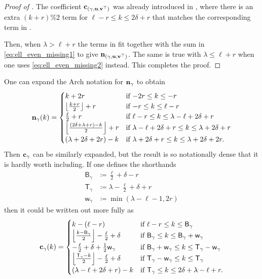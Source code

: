\elleven*
\begin{proof}
  [Proof of ]
  The coefficient $\mathbf c_{(\gamma, \mathbf u, \mathbf v^\top)}$ was already introduced in ,
  where there is an extra $(k+r)\%2$ term for $\ell-r \le k \le 2\delta+r$
  that matches the corresponding term in .

  Then, when $\lambda > \ell + r$ the terms in 
  fit together with the sum in \eqref{eq:ell_even_missing1} to give $\mathbf n_{(\gamma, \mathbf u, \mathbf v^\top)}$.
  The same is true with $\lambda \le \ell + r$
  when one uses \eqref{eq:ell_even_missing2} instead.
  This completes the proof.
\end{proof}

\begin{remark}
  One can expand the Arch notation for $\mathbf n_\gamma$ to obtain
  \[
    \mathbf n_\gamma(k) =
    \begin{cases}
      k + 2r & \text{if } {-2r} \le k \le -r \\
      \left\lfloor \frac{k+r}{2} \right\rfloor + r & \text{if }{-r} \le k \le \ell-r \\
      \frac{\ell}{2} + r & \text{if } \ell - r \le k \le \lambda - \ell + 2\delta +  r \\
      \left\lfloor \frac{(2\delta+\lambda+r)-k}{2} \right\rfloor + r & \text{if } \lambda - \ell + 2\delta + r \le k \le \lambda + 2\delta + r \\
      (\lambda + 2\delta + 2r) - k & \text{if } \lambda + 2\delta + r \le k \le \lambda + 2\delta + 2r.
    \end{cases}
  \]
  Then $\mathbf c_\gamma$ can be similarly expanded, but the result is so notationally dense
  that it is hardly worth including.
  If one defines the shorthands
  \begin{align*}
    \mathsf{B}_\gamma &\coloneqq \frac{\ell}{2} + \delta - r \\
    \mathsf{T}_\gamma &\coloneqq \lambda - \frac{\ell}{2} + \delta + r \\
    \mathsf{w}_\gamma &\coloneqq \min(\lambda-\ell-1, 2r)
  \end{align*}
  then it could be written out more fully as
  \[
    \mathbf c_\gamma(k) = \begin{cases}
      k - (\ell - r)
        & \text{if } \ell-r \le k \le \mathsf{B}_\gamma \\
      \left\lfloor \frac{k - \mathsf{B}_\gamma}{2} \right\rfloor - \frac{\ell}{2} + \delta
        &\text{if } \mathsf{B}_\gamma \le k \le \mathsf{B}_\gamma + \mathsf{w}_\gamma \\
      - \frac{\ell}{2} + \delta + \frac{1}{2} \mathsf{w}_\gamma
        &\text{if } \mathsf{B}_\gamma + \mathsf{w}_\gamma \le k \le \mathsf{T}_\gamma - \mathsf{w}_\gamma \\
      \left\lfloor \frac{\mathsf{T}_\gamma - k}{2} \right\rfloor - \frac{\ell}{2} + \delta
        &\text{if } \mathsf{T}_\gamma - \mathsf{w}_\gamma \le k \le \mathsf{T}_\gamma \\
        (\lambda - \ell + 2\delta + r) - k
        & \text{if } \mathsf{T}_\gamma \le k \le 2\delta + \lambda - \ell + r.
    \end{cases}
  \]
\end{remark}

